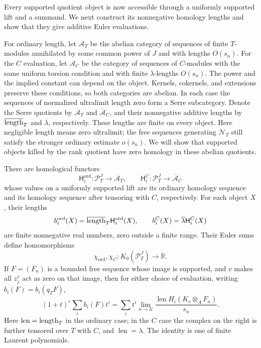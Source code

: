 Every supported quotient object is now accessible through a uniformly
supported lift and a summand. We next construct its nonnegative homology
lengths and show that they give additive Euler evaluations.

For ordinary length, let $\mathcal A_T$ be the abelian category
of sequences of finite $T$-modules annihilated by some common power
of $J$ and with lengths $O(s_n)$. For the $C$ evaluation, let
$\mathcal A_C$ be the category of sequences of $C$-modules with
the same uniform torsion condition and with finite $\lambda$-lengths
$O(s_n)$. The power and the implied constant can depend on the
object. Kernels, cokernels, and extensions preserve these conditions,
so both categories are abelian. In each case the sequences of
normalized ultralimit length zero form a Serre subcategory. Denote
the Serre quotients by $\overline{\mathcal A}_T$ and
$\overline{\mathcal A}_C$, and their nonnegative additive lengths
by $\overline{\operatorname{length}}_T$ and $\overline\lambda$, respectively.
These lengths are finite on every object.
Here negligible length means zero ultralimit; the free sequences
generating $\mathcal N_T$ still satisfy the stronger ordinary estimate
$o(s_n)$. We will show that supported objects killed by the rank
quotient have zero homology in these abelian quotients.

\begin{proposition}
\label{as:evaluations}
There are homological functors
\[
 \mathsf H_i^{\mathrm{ord}}:\mathcal P_T^J
       \longrightarrow\overline{\mathcal A}_T,
 \qquad
 \mathsf H_i^C:\mathcal P_T^J
       \longrightarrow\overline{\mathcal A}_C
\]
whose values on a uniformly supported lift are its ordinary homology
sequence and its homology sequence after tensoring with $C$,
respectively. For each object $X$, their lengths
\[
 b_i^{\mathrm{ord}}(X)=\overline{\operatorname{length}}_T
       \mathsf H_i^{\mathrm{ord}}(X),
 \qquad
 b_i^C(X)=\overline\lambda\mathsf H_i^C(X)
\]
are finite nonnegative real numbers, zero outside a finite range.
Their Euler sums define homomorphisms
\[
 \chi_{\mathrm{ord}},\chi_C:K_0(\mathcal P_T^J)\longrightarrow\mathbb R.
\]
If $F=(F_n)$ is a bounded free sequence whose image is supported,
and $v$ makes all $z_j^v$ act as zero on that image, then for either
choice of evaluation, writing $b_i(F)=b_i(q_TF)$,
\begin{equation}
 (1+t)^e\sum_i b_i(F)t^i
  =\sum_i t^i\lim_{n\to\mathcal U}
     \frac{\operatorname{len}
       H_i(K_v\otimes_A F_n)}{s_n}.
 \label{as:koszul-polynomial}
\end{equation}
Here $\operatorname{len}=\operatorname{length}_T$ in the ordinary case; in the
$C$ case the complex on the right is further tensored over $T$
with $C$, and $\operatorname{len}=\lambda$. The identity is one
of finite Laurent polynomials.
\end{proposition}

